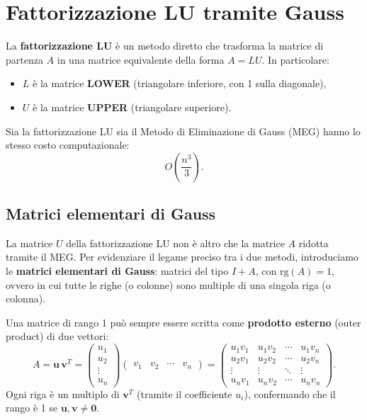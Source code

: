 \documentclass[a4paper,12pt]{article}
\theoremstyle{definition}
\theoremstyle{remark}
\begin{document}
\section{Fattorizzazione LU tramite Gauss}

La \textbf{fattorizzazione LU} è un metodo diretto che trasforma la matrice di partenza $A$ in una
matrice equivalente della forma $A = LU$. In particolare:
\begin{itemize}
  \item $L$ è la matrice \textbf{LOWER} (triangolare inferiore, con 1 sulla diagonale),
  \item $U$ è la matrice \textbf{UPPER} (triangolare superiore).
\end{itemize}
Sia la fattorizzazione LU sia il Metodo di Eliminazione di Gauss (MEG) hanno lo stesso costo
computazionale:
\[
  O\!\left(\frac{n^3}{3}\right).
\]

\subsection{Matrici elementari di Gauss}

La matrice $U$ della fattorizzazione LU non è altro che la matrice $A$ ridotta tramite il MEG.
Per evidenziare il legame preciso tra i due metodi, introduciamo le \textbf{matrici elementari
di Gauss}: matrici del tipo $I + A$, con $\mathrm{rg}(A)=1$, ovvero in cui tutte le righe (o
colonne) sono multiple di una singola riga (o colonna).

Una matrice di rango 1 può sempre essere scritta come \textbf{prodotto esterno} (outer product) di
due vettori:
\[
  A = \mathbf{u}\,\mathbf{v}^T
  = \begin{pmatrix} u_1 \\ u_2 \\ \vdots \\ u_n \end{pmatrix}
    \begin{pmatrix} v_1 & v_2 & \cdots & v_n \end{pmatrix}
  = \begin{pmatrix}
      u_1 v_1 & u_1 v_2 & \cdots & u_1 v_n \\
      u_2 v_1 & u_2 v_2 & \cdots & u_2 v_n \\
      \vdots  & \vdots  & \ddots & \vdots  \\
      u_n v_1 & u_n v_2 & \cdots & u_n v_n
    \end{pmatrix}.
\]
Ogni riga è un multiplo di $\mathbf{v}^T$ (tramite il coefficiente $u_i$), confermando che il rango
è 1 se $\mathbf{u},\mathbf{v}\neq\mathbf{0}$.
\end{document}
